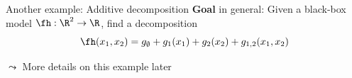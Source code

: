 \documentclass[10pt,compress,t,notes=noshow, xcolor=table]{beamer}
\newcommand{\open}{}
\newcommand{\close}{}
\begin{document}



    

\begin{framev}[align=top]{Another example: Additive decomposition}
\textbf{Goal} in general:
Given a black-box model \(\fh: \R^2 \to \R\), find a decomposition
\begin{equation}
\fh(x_1, x_2) =  g_\emptyset + g_1(x_1) + g_2(x_2) + g_{\open 1, 2 \close}(x_1, x_2)
\end{equation}

\pause
\begin{example}
    
$\leadsto$ More details on this example later
\end{example}
\end{framev}
\end{document}
